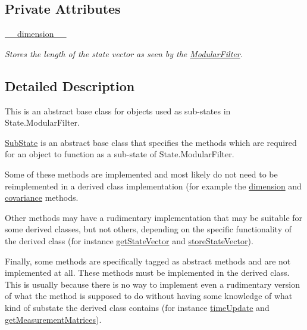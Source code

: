 \subsection*{Private Attributes}
\begin{DoxyCompactItemize}
\item 
\hyperlink{classmodest_1_1substates_1_1SubState_1_1SubState_af31a4993c39daa7aa34ef3312d41df34}{\+\_\+\+\_\+dimension\+\_\+\+\_\+}
\begin{DoxyCompactList}\small\item\em Stores the length of the state vector as seen by the \hyperlink{namespacemodest_1_1ModularFilter}{Modular\+Filter}. \end{DoxyCompactList}\end{DoxyCompactItemize}


\subsection{Detailed Description}
This is an abstract base class for objects used as sub-\/states in State.\+Modular\+Filter. 

\hyperlink{classmodest_1_1substates_1_1SubState_1_1SubState}{Sub\+State} is an abstract base class that specifies the methods which are required for an object to function as a sub-\/state of State.\+Modular\+Filter.

Some of these methods are implemented and most likely do not need to be reimplemented in a derived class implementation (for example the \hyperlink{classmodest_1_1substates_1_1SubState_1_1SubState_aaf7473d2ebcd61adf1b7bb2262eb31d1}{dimension} and \hyperlink{classmodest_1_1substates_1_1SubState_1_1SubState_af77dd1cc9f3c6cc9e5619a2f56ca0cdd}{covariance} methods.

Other methods may have a rudimentary implementation that may be suitable for some derived classes, but not others, depending on the specific functionality of the derived class (for instance \hyperlink{classmodest_1_1substates_1_1SubState_1_1SubState_a26146efb15c1d33fee433df4725bae45}{get\+State\+Vector} and \hyperlink{classmodest_1_1substates_1_1SubState_1_1SubState_a00fad4cb7ed9699163f5a37ed34a3032}{store\+State\+Vector}).

Finally, some methods are specifically tagged as abstract methods and are not implemented at all. These methods must be implemented in the derived class. This is usually because there is no way to implement even a rudimentary version of what the method is supposed to do without having some knowledge of what kind of substate the derived class contains (for instance \hyperlink{classmodest_1_1substates_1_1SubState_1_1SubState_aea424eed4e6395ba3fcd5206d3f39bbe}{time\+Update} and \hyperlink{classmodest_1_1substates_1_1SubState_1_1SubState_a1d9f075da3eff95098f0519c09dd4513}{get\+Measurement\+Matrices}).

